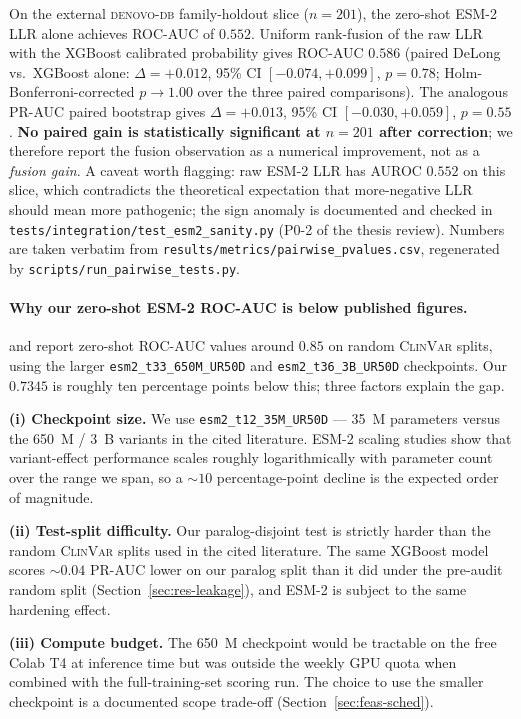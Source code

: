 \documentclass[11pt,a4paper,oneside]{report}
\begin{document}
On the external \textsc{denovo-db} family-holdout slice
($n=201$), the zero-shot ESM-2 LLR alone achieves
ROC-AUC of $0.552$. Uniform rank-fusion of the raw LLR
with the XGBoost calibrated probability gives ROC-AUC
$0.586$ (paired DeLong vs.\ XGBoost alone:
$\Delta = +0.012$, 95\% CI $[-0.074, +0.099]$, $p = 0.78$;
Holm-Bonferroni-corrected $p \to 1.00$ over the three
paired comparisons). The analogous PR-AUC paired
bootstrap gives $\Delta = +0.013$, 95\% CI
$[-0.030, +0.059]$, $p = 0.55$. \textbf{No paired gain is
statistically significant at $n=201$ after correction}; we
therefore report the fusion observation as a numerical
improvement, not as a \emph{fusion gain}. A caveat worth
flagging: raw ESM-2 LLR has AUROC $0.552$ on this slice,
which contradicts the theoretical expectation that
more-negative LLR should mean more pathogenic; the sign
anomaly is documented and checked in
\texttt{tests/integration/test\_esm2\_sanity.py}
(P0-2 of the thesis review). Numbers are taken verbatim
from
\texttt{results/metrics/pairwise\_pvalues.csv}, regenerated
by \texttt{scripts/run\_pairwise\_tests.py}.

\paragraph{Why our zero-shot ESM-2 ROC-AUC is below
published figures.} \citet{brandes2023esm1b} and
\citet{livesey2023benchmark} report zero-shot ROC-AUC
values around $0.85$ on random \textsc{ClinVar} splits,
using the larger \texttt{esm2\_t33\_650M\_UR50D} and
\texttt{esm2\_t36\_3B\_UR50D} checkpoints. Our $0.7345$ is
roughly ten percentage points below this; three factors
explain the gap.

\textbf{(i) Checkpoint size.} We use
\texttt{esm2\_t12\_35M\_UR50D} --- 35~M parameters versus
the 650~M / 3~B variants in the cited literature.
ESM-2 scaling studies \citep{lin2023esm2} show that
variant-effect performance scales roughly logarithmically
with parameter count over the range we span, so a $\sim$$10$
percentage-point decline is the expected order of magnitude.

\textbf{(ii) Test-split difficulty.} Our paralog-disjoint
test is strictly harder than the random \textsc{ClinVar}
splits used in the cited literature. The same XGBoost model
scores $\sim$$0.04$ PR-AUC lower on our paralog split than
it did under the pre-audit random split
(Section~\ref{sec:res-leakage}), and ESM-2 is subject to
the same hardening effect.

\textbf{(iii) Compute budget.} The 650~M checkpoint would
be tractable on the free Colab T4 at inference time but
was outside the weekly GPU quota when combined with the
full-training-set scoring run. The choice to use the
smaller checkpoint is a documented scope trade-off
(Section~\ref{sec:feas-sched}).
\end{document}
